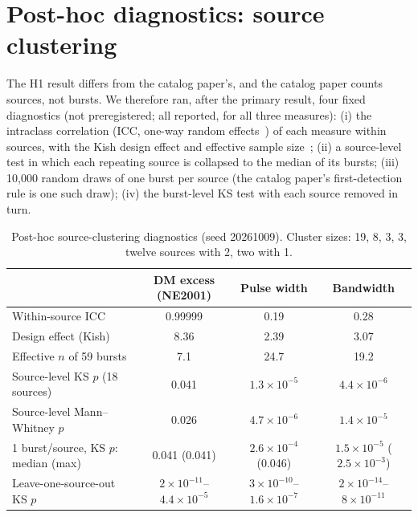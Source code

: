 \documentclass[11pt]{article}
\begin{document}
\section{Post-hoc diagnostics: source clustering}
The H1 result differs from the catalog paper's, and the catalog paper counts sources, not bursts. We therefore ran, after
the primary result, four fixed diagnostics (not preregistered; all reported, for all three measures): (i) the
intraclass correlation (ICC, one-way random effects~\cite{shrout1979}) of each measure within sources, with the Kish
design effect and effective sample size~\cite{kish1965}; (ii) a source-level test in which each repeating source is
collapsed to the median of its bursts; (iii) 10{,}000 random draws of one burst per source (the catalog paper's
first-detection rule is one such draw); (iv) the burst-level KS test with each source removed in turn.

\begin{table}[h]
\centering\footnotesize\setlength{\tabcolsep}{4pt}
\begin{tabular}{lccc}
\toprule
 & DM excess (NE2001) & Pulse width & Bandwidth\\
\midrule
Within-source ICC & 0.99999 & 0.19 & 0.28\\
Design effect (Kish) & 8.36 & 2.39 & 3.07\\
Effective $n$ of 59 bursts & 7.1 & 24.7 & 19.2\\
Source-level KS $p$ (18 sources) & 0.041 & $1.3\times10^{-5}$ & $4.4\times10^{-6}$\\
Source-level Mann--Whitney $p$ & 0.026 & $4.7\times10^{-6}$ & $1.4\times10^{-5}$\\
1 burst/source, KS $p$: median (max) & 0.041 (0.041) & $2.6\times10^{-4}$ (0.046) & $1.5\times10^{-5}$ ($2.5\times10^{-3}$)\\
Leave-one-source-out KS $p$ & $2\times10^{-11}$--$4.4\times10^{-5}$ & $3\times10^{-10}$--$1.6\times10^{-7}$ & $2\times10^{-14}$--$8\times10^{-11}$\\
\bottomrule
\end{tabular}
\caption{Post-hoc source-clustering diagnostics (seed 20261009). Cluster sizes: 19, 8, 3, 3, twelve sources with 2, two with 1.}
\end{table}
\end{document}
